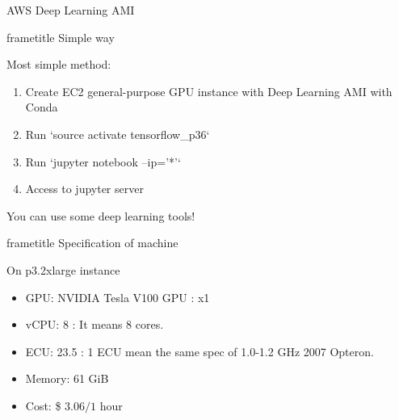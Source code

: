 \begin{frame}[plain,t]
  {AWS Deep Learning AMI}

  \begin{beamercolorbox}[rounded=true, center, shadow=true,wd=\linewidth]{frametitle}
    Simple way
  \end{beamercolorbox}
  Most simple method:

  \begin{enumerate}
    \item Create EC2 general-purpose GPU instance with Deep Learning AMI with Conda
    \item Run `source activate tensorflow\_p36`
    \item Run `jupyter notebook --ip='*'`
    \item Access to jupyter server
  \end{enumerate}

  You can use some deep learning tools!

  \begin{beamercolorbox}[rounded=true, center, shadow=true,wd=\linewidth]{frametitle}
    Specification of machine
  \end{beamercolorbox}

  On p3.2xlarge instance
  \begin{itemize}
    \item GPU: NVIDIA Tesla V100 GPU : x1
    \item vCPU: 8 : It means 8 cores.
    \item ECU: 23.5 : 1 ECU mean the same spec of 1.0-1.2 GHz 2007 Opteron.
    \item Memory: 61 GiB
    \item Cost: \$ $3.06 / 1$ hour
  \end{itemize}
\end{frame}
